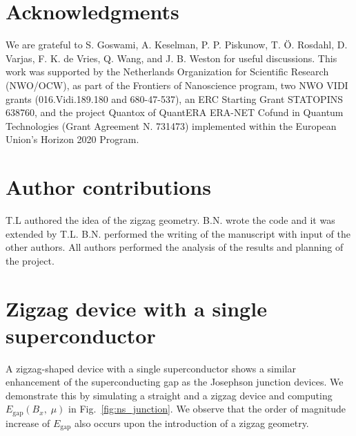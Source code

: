 \documentclass[english, twocolumn, 10pt, aps, superscriptaddress, floatfix, prb, citeautoscript]{revtex4-1}
\renewcommand{\comment}[2]{#2}
\begin{document}
\section{Acknowledgments}
We are grateful to  S. Goswami, A. Keselman, P. P. Piskunow, T. Ö. Rosdahl, D. Varjas, F. K. de Vries, Q. Wang, and J. B. Weston for useful discussions.
This work was supported by the Netherlands Organization for Scientific Research (NWO/OCW), as part of the Frontiers of Nanoscience program, two NWO VIDI grants (016.Vidi.189.180 and 680-47-537), an ERC Starting Grant STATOPINS 638760, and the project Quantox of QuantERA ERA-NET Cofund in Quantum Technologies (Grant Agreement N. 731473) implemented within the European Union's Horizon 2020 Program.

\section{Author contributions}
T.L authored the idea of the zigzag geometry.
B.N. wrote the code and it was extended by T.L.
B.N. performed the writing of the manuscript with input of the other authors.
All authors performed the analysis of the results and planning of the project.




\appendix

\section{Zigzag device with a single superconductor}\label{appendix:NS_junction}

\comment{We run the simulation and observe that the phase diagrams are the same but the zigzag device is still better.}
A zigzag-shaped device with a single superconductor shows a similar enhancement of the superconducting gap as the Josephson junction devices.
We demonstrate this by simulating a straight and a zigzag device and computing $E_\textrm{gap}(B_x, \; \mu)$ in Fig.~\ref{fig:ns_junction}.
We observe that the order of magnitude increase of $E_\textrm{gap}$ also occurs upon the introduction of a zigzag geometry.
\end{document}

